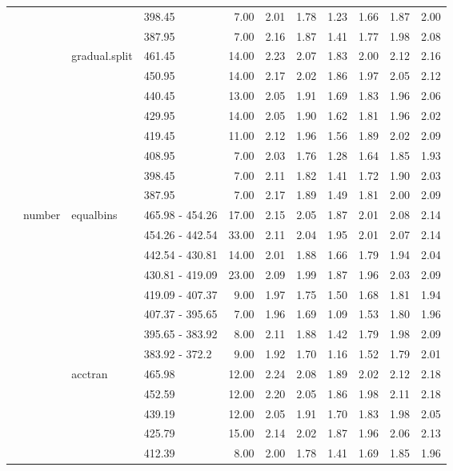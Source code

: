 \begin{longtable}{llllrrrrrrr}
   &  &  & 398.45 & 7.00 & 2.01 & 1.78 & 1.23 & 1.66 & 1.87 & 2.00 \\ 
   &  &  & 387.95 & 7.00 & 2.16 & 1.87 & 1.41 & 1.77 & 1.98 & 2.08 \\ 
   &  & gradual.split & 461.45 & 14.00 & 2.23 & 2.07 & 1.83 & 2.00 & 2.12 & 2.16 \\ 
   &  &  & 450.95 & 14.00 & 2.17 & 2.02 & 1.86 & 1.97 & 2.05 & 2.12 \\ 
   &  &  & 440.45 & 13.00 & 2.05 & 1.91 & 1.69 & 1.83 & 1.96 & 2.06 \\ 
   &  &  & 429.95 & 14.00 & 2.05 & 1.90 & 1.62 & 1.81 & 1.96 & 2.02 \\ 
   &  &  & 419.45 & 11.00 & 2.12 & 1.96 & 1.56 & 1.89 & 2.02 & 2.09 \\ 
   &  &  & 408.95 & 7.00 & 2.03 & 1.76 & 1.28 & 1.64 & 1.85 & 1.93 \\ 
   &  &  & 398.45 & 7.00 & 2.11 & 1.82 & 1.41 & 1.72 & 1.90 & 2.03 \\ 
   &  &  & 387.95 & 7.00 & 2.17 & 1.89 & 1.49 & 1.81 & 2.00 & 2.09 \\ 
   & number & equalbins & 465.98 - 454.26 & 17.00 & 2.15 & 2.05 & 1.87 & 2.01 & 2.08 & 2.14 \\ 
   &  &  & 454.26 - 442.54 & 33.00 & 2.11 & 2.04 & 1.95 & 2.01 & 2.07 & 2.14 \\ 
   &  &  & 442.54 - 430.81 & 14.00 & 2.01 & 1.88 & 1.66 & 1.79 & 1.94 & 2.04 \\ 
   &  &  & 430.81 - 419.09 & 23.00 & 2.09 & 1.99 & 1.87 & 1.96 & 2.03 & 2.09 \\ 
   &  &  & 419.09 - 407.37 & 9.00 & 1.97 & 1.75 & 1.50 & 1.68 & 1.81 & 1.94 \\ 
   &  &  & 407.37 - 395.65 & 7.00 & 1.96 & 1.69 & 1.09 & 1.53 & 1.80 & 1.96 \\ 
   &  &  & 395.65 - 383.92 & 8.00 & 2.11 & 1.88 & 1.42 & 1.79 & 1.98 & 2.09 \\ 
   &  &  & 383.92 - 372.2 & 9.00 & 1.92 & 1.70 & 1.16 & 1.52 & 1.79 & 2.01 \\ 
   &  & acctran & 465.98 & 12.00 & 2.24 & 2.08 & 1.89 & 2.02 & 2.12 & 2.18 \\ 
   &  &  & 452.59 & 12.00 & 2.20 & 2.05 & 1.86 & 1.98 & 2.11 & 2.18 \\ 
   &  &  & 439.19 & 12.00 & 2.05 & 1.91 & 1.70 & 1.83 & 1.98 & 2.05 \\ 
   &  &  & 425.79 & 15.00 & 2.14 & 2.02 & 1.87 & 1.96 & 2.06 & 2.13 \\ 
   &  &  & 412.39 & 8.00 & 2.00 & 1.78 & 1.41 & 1.69 & 1.85 & 1.96 \\ 

\end{longtable}
